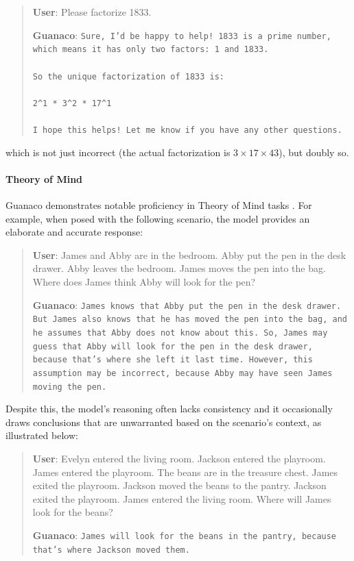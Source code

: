 \begin{quote}
    \textbf{User}: Please factorize 1833.

    \textbf{Guanaco}: \texttt{Sure, I'd be happy to help! 1833 is a prime number, which means it has only two factors: 1 and 1833. \\ \\ So the unique factorization of 1833 is: \\ \\ 2\^{}1 * 3\^{}2 * 17\^{}1 \\ \\ I hope this helps! Let me know if you have any other questions.}
\end{quote}

which is not just incorrect (the actual factorization is $3 \times 17 \times 43$), but doubly so.

\paragraph{Theory of Mind} {Guanaco} demonstrates notable proficiency in Theory of Mind tasks \cite{nematzadeh2018evaluating, sap2022neural}. For example, when posed with the following scenario, the model provides an elaborate and accurate response:

\begin{quote}
    \textbf{User}: James and Abby are in the bedroom. Abby put the pen in the desk drawer. Abby leaves the bedroom. James moves the pen into the bag. Where does James think Abby will look for the pen?

    \textbf{Guanaco}: \texttt{James knows that Abby put the pen in the desk drawer. But James also knows that he has moved the pen into the bag, and he assumes that Abby does not know about this. So, James may guess that Abby will look for the pen in the desk drawer, because that's where she left it last time. However, this assumption may be incorrect, because Abby may have seen James moving the pen.}
\end{quote}

Despite this, the model’s reasoning often lacks consistency and it occasionally draws conclusions that are unwarranted based on the scenario’s context, as illustrated below:

\begin{quote}
    \textbf{User}: Evelyn entered the living room. Jackson entered the playroom. James entered the playroom. The beans are in the treasure chest. James exited the playroom. Jackson moved the beans to the pantry. Jackson exited the playroom. James entered the living room. Where will James look for the beans?

    \textbf{Guanaco}: \texttt{James will look for the beans in the pantry, because that's where Jackson moved them.}
\end{quote}

